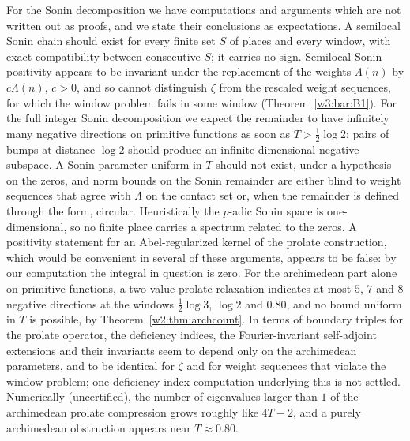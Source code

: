 \documentclass[11pt]{amsart}
\theoremstyle{definition}
\theoremstyle{remark}
\numberwithin{equation}{section}
\begin{document}
For the Sonin decomposition we have computations and arguments which are not written out as
proofs, and we state their conclusions as expectations. A semilocal Sonin chain should exist for
every finite set $S$ of places and every window, with exact compatibility between consecutive $S$;
it carries no sign. Semilocal Sonin positivity appears to be invariant under the replacement of
the weights $\Lambda(n)$ by $c\Lambda(n)$, $c>0$, and so cannot distinguish $\zeta$ from the
rescaled weight sequences, for which the window problem fails in some window
(Theorem~\ref{w3:bar:B1}). For the full integer Sonin decomposition we expect the remainder to
have infinitely many negative directions on primitive functions as soon as $T>\frac12\log2$: pairs
of bumps at distance $\log2$ should produce an infinite-dimensional negative subspace. A Sonin
parameter uniform in $T$ should not exist, under a hypothesis on the zeros, and norm bounds on the
Sonin remainder are either blind to weight sequences that agree with $\Lambda$ on the contact set
or, when the remainder is defined through the form, circular. Heuristically the $p$-adic Sonin
space is one-dimensional, so no finite place carries a spectrum related to the zeros. A positivity
statement for an Abel-regularized kernel of the prolate construction, which would be convenient in
several of these arguments, appears to be false: by our computation the integral in question is
zero. For the archimedean part alone on primitive functions, a two-value prolate relaxation
indicates at most $5$, $7$ and $8$ negative directions at the windows $\frac12\log3$, $\log2$ and
$0.80$, and no bound uniform in $T$ is possible, by Theorem~\ref{w2:thm:archcount}. In terms of
boundary triples for the prolate operator, the deficiency indices, the Fourier-invariant
self-adjoint extensions and their invariants seem to depend only on the archimedean parameters,
and to be identical for $\zeta$ and for weight sequences that violate the window problem; one
deficiency-index computation underlying this is not settled. Numerically (uncertified), the number
of eigenvalues larger than $1$ of the archimedean prolate compression grows roughly like $4T-2$,
and a purely archimedean obstruction appears near $T\approx0.80$.
\end{document}
